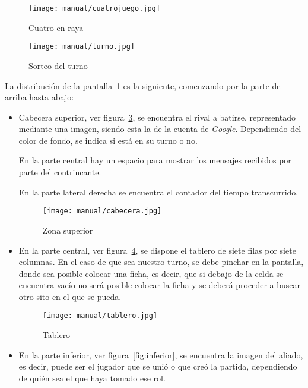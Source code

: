 \begin{figure}%
	\centering
	\texttt{[image: manual/cuatrojuego.jpg]}
	\caption{Cuatro en raya}\label{fig:cuatrojuego}
\end{figure}

\begin{figure}%
	\centering
	\texttt{[image: manual/turno.jpg]}
	\caption{Sorteo del turno}\label{fig:sorteo}
\end{figure}

La distribución de la pantalla~\ref{fig:cuatrojuego} es la siguiente, comenzando por la parte de arriba hasta abajo:

\begin{itemize}
	\item Cabecera superior, ver figura~\ref{fig:cabecera}, se encuentra el rival a batirse, representado mediante una imagen, siendo esta la de la cuenta de \emph{Google}. Dependiendo del color de fondo, se indica si está en su turno o no.
	
	En la parte central hay un espacio para mostrar los mensajes recibidos por parte del contrincante.
	
	En la parte lateral derecha se encuentra el contador del tiempo transcurrido.
	
	 \begin{figure}%
	 	\centering
	 	\texttt{[image: manual/cabecera.jpg]}
	 	\caption{Zona superior}\label{fig:cabecera}
	 \end{figure}
 
	\item En la parte central, ver figura~\ref{fig:tablero}, se dispone el tablero de siete filas por siete columnas. En el caso de que sea nuestro turno, se debe pinchar en la pantalla, donde sea posible colocar una ficha, es decir, que si debajo de la celda se encuentra vacío no será posible colocar la ficha y se deberá proceder a buscar otro sito en el que se pueda.
	
	\begin{figure}%
		\centering
		\texttt{[image: manual/tablero.jpg]}
		\caption{Tablero}\label{fig:tablero}
	\end{figure}

	\item En la parte inferior, ver figura~\ref{fig:inferior}, se encuentra la imagen del aliado, es decir, puede ser el jugador que se unió o que creó la partida, dependiendo de quién sea el que haya tomado ese rol.
	

\end{itemize}
